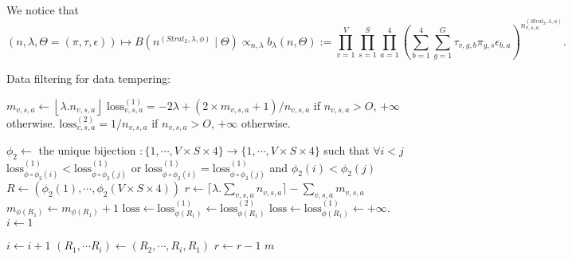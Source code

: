 \documentclass{article}
\begin{document}
We notice that $$(n,\lambda,\Theta=(\pi, \tau,\epsilon))\mapsto B\left(n^{(Strat_2,\lambda,\phi)}\mid\Theta\right) \propto_{n,\lambda} b_\lambda(n,\Theta):= \prod_{v=1}^{V} \prod_{s = 1}^{S} \prod_{a = 1}^{4} \left(\sum_{b=1}^{4} \sum_{g = 1}^{G} \tau_{v,g,b} \pi_{g,s} \epsilon_{b,a} \right)^{n_{v,s,a}^{(Strat_2,\lambda,\phi)}}.$$


\begin{algorithm}[H]
\caption{Data filtering for data tempering: }
\label{alg:strat2}
\begin{algorithmic}


\State $m_{v,s,a}\gets\left\lfloor \lambda. n_{v,s,a}\right\rfloor$
\State $\mathrm{loss}_{v,s,a}^{(1)}=-2\lambda+(2\times m_{v,s,a}+1)/n_{v,s,a}$ if $n_{v,s,a}>O$, $+\infty$ otherwise.
\State $\mathrm{loss}_{v,s,a}^{(2)}=1/n_{v,s,a}$ if $n_{v,s,a}>O$, $+\infty$ otherwise.

\EndFor
\State $\phi_2\gets$  the unique bijection 
$:\{1,\cdots,V\times S\times 4\}\to\{1,\cdots,V\times S\times 4\}$ such that 
$\forall i<j$ $\mathrm{loss}^{(1)}_{\phi\circ\phi_2(i)} <\mathrm{loss}^{(1)}_{\phi\circ\phi_2(j)}$ or 
$\mathrm{loss}^{(1)}_{\phi\circ\phi_2(i)}=\mathrm{loss}^{(1)}_{\phi\circ\phi_2(j)}$ and $\phi_2(i)<\phi_2(j)$
\State $R\gets\left(\phi_2(1),\cdots, \phi_2(V\times S\times 4)\right)$
\State $r\gets  \lceil \lambda.\sum_{v,s,a}n_{v,s,a}\rceil- \sum_{v,s,a}m_{v,s,a} $
    \State $m_{\phi(R_1)}\gets     m_{\phi(R_1)}+1$
    \State $\mathrm{loss}\gets \mathrm{loss}^{(1)}_{\phi(R_1)}\gets \mathrm{loss}^{(2)}_{\phi(R_1)}$ 
    \Else
    \State $\mathrm{loss}\gets \mathrm{loss}^{(1)}_{\phi(R_1)}\gets +\infty$.
    \EndIf
    \State $i\gets 1$
    
    \State    $i\gets{i+1}$
    \EndWhile
        \State $(R_1,\cdots R_i)\gets (R_2,\cdots, R_i,R_1)$
    \EndIf 
    \State $r\gets r-1$
    \EndWhile
    \State \Return $m$
\EndProcedure
\end{algorithmic}
\end{algorithm}
\end{document}
